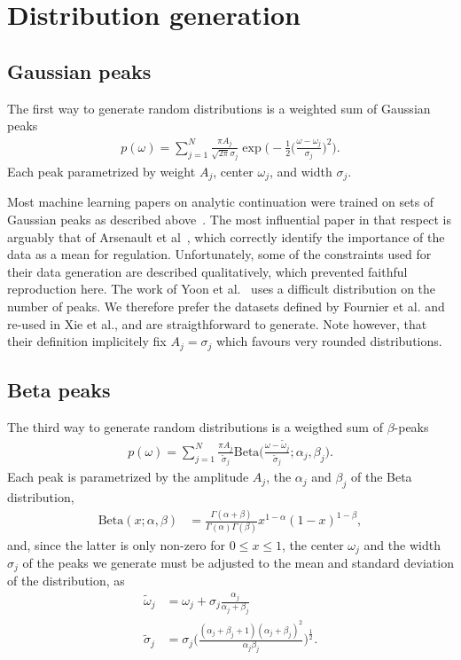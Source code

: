 \documentclass[notitlepage,11pt,nofootinbib]{revtex4-1}
\begin{document}
\section{Distribution generation}

\subsection{Gaussian peaks}
The first way to generate random distributions is a weighted sum of Gaussian peaks 
\begin{align}
p(\omega)
=
\sum_{j=1}^{N} 
\frac{\pi A_j}{\sqrt{2\pi} \sigma_j}
\exp\bigg(-\frac{1}{2}\Big(\frac{\omega-\omega_j}{\sigma_j}\Big)^2\bigg).
\end{align}
Each peak parametrized by weight $A_j$, center $\omega_j$, and width $\sigma_j$.

Most machine learning papers on analytic continuation were trained on sets of Gaussian peaks as described above~\cite{Arsenault2017, Yoon2018, Xie2019, Fournier2020}. The most influential paper in that respect is arguably that of Arsenault et al~\cite{Arsenault2017}, which correctly identify the importance of the data as a mean for regulation. Unfortunately, some of the constraints used for their data generation are described qualitatively, which prevented faithful reproduction here. The work of Yoon et al.~\cite{Yoon2018} uses a difficult distribution on the number of peaks. We therefore prefer the datasets defined by Fournier et al.\cite{Fournier2020} and re-used in Xie et al.\cite{Xie2019}, and are straigthforward to generate. Note however, that their definition implicitely fix $A_j=\sigma_j$ which favours very rounded distributions.


\subsection{Beta peaks}
The third way to generate random distributions is a weigthed sum of $\beta$-peaks
\begin{align}
p(\omega)
=
\sum_{j=1}^{N} 
\frac{\pi A_j}{\tilde{\sigma}_j}
\text{Beta}\bigg(
\frac{\omega-\tilde{\omega}_j}{\tilde{\sigma}_j}
;\alpha_j,\beta_j
\bigg).
\end{align}
Each peak is parametrized by the amplitude $A_j$, the $\alpha_j$ and $\beta_j$ of the Beta distribution,
\begin{align}
\text{Beta}(x;\alpha,\beta) 
&=
\frac{\Gamma(\alpha+\beta)}{\Gamma(\alpha)\Gamma(\beta)} x^{1-\alpha}(1-x)^{1-\beta},
\end{align}
and, since the latter is only non-zero for $0\leq x\leq 1$, the center $\omega_j$ and the width $\sigma_j$ of the peaks we generate must be adjusted to the mean and standard deviation of the distribution, as
\begin{align}
\tilde{\omega}_j
&=
\omega_j+\sigma_j
\frac{\alpha_j}{\alpha_j+\beta_j}
\\
\tilde{\sigma}_j
&=
\sigma_j
\bigg(
\frac
{(\alpha_j+\beta_j+1)(\alpha_j+\beta_j)^2}
{\alpha_j\beta_j}
\bigg)^{\frac{1}{2}}.
\end{align}
\end{document}
